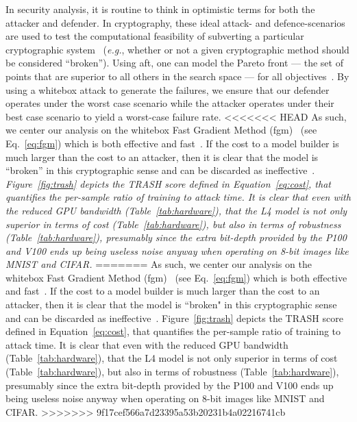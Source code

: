 \documentclass[sn-mathphys-num]{sn-jnl}%
\newcommand{\cm}[1]{\textit{{\color{blue}#1}}}
\begin{document}
In security analysis, it is  routine to think in optimistic terms for both the attacker and defender. In cryptography, these ideal attack- and defence-scenarios are used to test the computational feasibility of subverting a particular cryptographic system~\cite{kamal2017study,leurent2020sha} (\textit{e.g.}, whether or not a given cryptographic method should be considered ``broken'').
Using \acrshort{aft}, one can model the Pareto front --- the set of points that are superior to all others in the search space --- for all objectives~\cite{zitzler2008quality}.
By using a whitebox attack to generate the failures, we ensure that our defender operates under the worst case scenario while the attacker operates under their best case scenario to yield a worst-case failure rate.
<<<<<<< HEAD
As such, we center our analysis on the whitebox Fast Gradient Method (\acrshort{fgm})~\cite{fgm} (see Eq.~\ref{eq:fgm}) which is both effective and fast~\cite{meyers}.
If the cost to a model builder is much larger than the cost to an attacker, then it is  clear that the model is ``broken'' in this cryptographic sense and can be discarded as ineffective~\cite{meyers_aft}.
\cm{Figure~\ref{fig:trash} depicts the TRASH score defined in Equation~\ref{eq:cost}, that quantifies the per-sample ratio of training to attack time.
It is clear that even with the reduced GPU bandwidth (Table~\ref{tab:hardware}), that the L4 model is not only superior in terms of cost (Table~\ref{tab:hardware}), but also in terms of robustness (Table~\ref{tab:hardware}), presumably since the extra bit-depth provided by the P100 and V100 ends up being useless noise anyway when operating on 8-bit images like MNIST and CIFAR.}
=======
As such, we center our analysis on the whitebox Fast Gradient Method (\acrshort{fgm})~\cite{fgm} (see Eq.~\ref{eq:fgm}) which is both effective and fast~\cite{meyers}. 
If the cost to a model builder is much larger than the cost to an attacker, then it is  clear that the model is ``broken" in this cryptographic sense and can be discarded as ineffective~\cite{meyers_aft}. 
Figure~\ref{fig:trash} depicts the TRASH score defined in Equation~\ref{eq:cost}, that quantifies the per-sample ratio of training to attack time. 
It is clear that even with the reduced GPU bandwidth (Table~\ref{tab:hardware}), that the L4 model is not only superior in terms of cost (Table~\ref{tab:hardware}), but also in terms of robustness (Table~\ref{tab:hardware}), presumably since the extra bit-depth provided by the P100 and V100 ends up being useless noise anyway when operating on 8-bit images like MNIST and CIFAR.
>>>>>>> 9f17cef566a7d23395a53b20231b4a02216741cb
\end{document}
